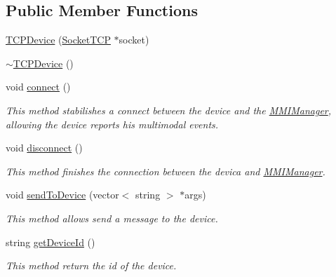 \subsection*{Public Member Functions}
\begin{DoxyCompactItemize}
\item 
\hyperlink{classbr_1_1ufscar_1_1lince_1_1mmi_1_1socketconn_1_1TCPDevice_abad8a6e03c83f08d453c45802dbf5d24}{TCPDevice} (\hyperlink{classbr_1_1ufscar_1_1lince_1_1mmi_1_1socketconn_1_1SocketTCP}{SocketTCP} $\ast$socket)
\item 
\hyperlink{classbr_1_1ufscar_1_1lince_1_1mmi_1_1socketconn_1_1TCPDevice_a54143d24714fe38957c7f3432d7f4ddf}{$\sim$TCPDevice} ()
\item 
void \hyperlink{classbr_1_1ufscar_1_1lince_1_1mmi_1_1socketconn_1_1TCPDevice_a2a474f7f39371460268525b0a840cd4f}{connect} ()
\begin{DoxyCompactList}\small\item\em This method stabilishes a connect between the device and the \hyperlink{classbr_1_1ufscar_1_1lince_1_1mmi_1_1MMIManager}{MMIManager}, allowing the device reports his multimodal events. \item\end{DoxyCompactList}\item 
void \hyperlink{classbr_1_1ufscar_1_1lince_1_1mmi_1_1socketconn_1_1TCPDevice_a5b1eca485752195ce49f03475229ca1f}{disconnect} ()
\begin{DoxyCompactList}\small\item\em This method finishes the connection between the devica and \hyperlink{classbr_1_1ufscar_1_1lince_1_1mmi_1_1MMIManager}{MMIManager}. \item\end{DoxyCompactList}\item 
void \hyperlink{classbr_1_1ufscar_1_1lince_1_1mmi_1_1socketconn_1_1TCPDevice_a533e8c0d49d2418a244e46242dc70d99}{sendToDevice} (vector$<$ string $>$ $\ast$args)
\begin{DoxyCompactList}\small\item\em This method allows send a message to the device. \item\end{DoxyCompactList}\item 
string \hyperlink{classbr_1_1ufscar_1_1lince_1_1mmi_1_1socketconn_1_1TCPDevice_aa45bb0937e02c3d58c9923c369408e5a}{getDeviceId} ()
\begin{DoxyCompactList}\small\item\em This method return the id of the device. \item\end{DoxyCompactList}\item 

\end{DoxyCompactItemize}
